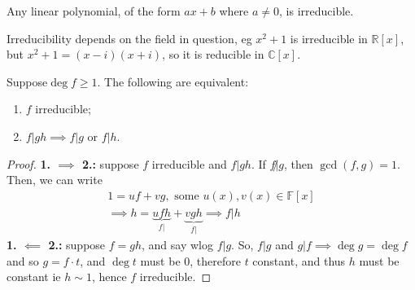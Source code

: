 \documentclass[12pt,oneside]{article}
\begin{document}
\begin{remark}
  Any linear polynomial, of the form $ax + b$ where $a \neq 0$, is irreducible.
\end{remark}

\begin{remark}
  Irreducibility depends on the field in question, eg $x^2 +1$ is irreducible in $\mathbb{R}[x]$, but $x^2 + 1 = (x-i)(x+i)$, so it is reducible in $\mathbb{C}[x]$.
\end{remark}

\begin{proposition}\label{prop:divirredequiv}
  Suppose\footnotemark $\deg f \geq 1$. The following are equivalent:
  \begin{enumerate}
    \item $f$ irreducible;
    \item $f | gh \implies f | g$ or $f | h$.
  \end{enumerate}
\end{proposition}


\begin{proof}
  \textbf{1. $\implies$ 2.: } suppose $f$ irreducible and $f | gh$. If $f \not | g$, then $\gcd (f,g) = 1$. Then, we can write \begin{align*}
    1 = uf + vg, \text{ some } u(x), v(x) \in \mathbb{F}[x]\\
    \implies h = \underbrace{ufh}_{f|} + \underbrace{vgh}_{f|} \implies f | h
  \end{align*}
  \textbf{1. $\impliedby$ 2.: } suppose $f = gh$, and say wlog $f | g$. So, $f | g$ and $g|f \implies \deg g = \deg f$ and so $g = f \cdot t$, and $\deg t$ must be 0, therefore $t$ constant, and thus $h$ must be constant ie $h \sim 1$, hence $f$ irreducible.
\end{proof}
\end{document}
